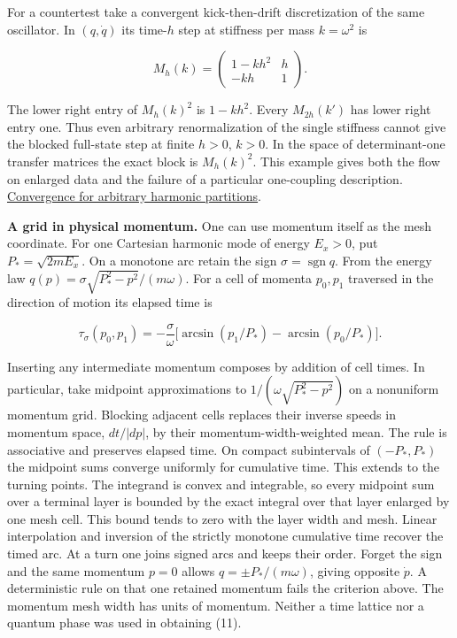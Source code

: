 \documentclass[11pt,a4paper]{article}
\begin{document}
For a countertest take a convergent kick-then-drift discretization of
the same oscillator. In \((q,\dot q)\) its time-\(h\) step at stiffness
per mass \(k=\omega^2\) is

\[
 M_h(k)=\begin{pmatrix}1-kh^2&h\\-kh&1\end{pmatrix}.
\]

The lower right entry of \(M_h(k)^2\) is \(1-kh^2\). Every
\(M_{2h}(k')\) has lower right entry one. Thus even arbitrary
renormalization of the single stiffness cannot give the blocked
full-state step at finite \(h>0\), \(k>0\). In the space of
determinant-one transfer matrices the exact block is \(M_h(k)^2\). This
example gives both the flow on enlarged data and the failure of a
particular one-coupling description.
\href{https://arivero.github.io/navstokgap/notes/refinement-composition-and-limit.html\#c.-all-refinement-sequences-and-two-microscopic-kick-orders}{Convergence
for arbitrary harmonic partitions}.

\textbf{A grid in physical momentum.} One can use momentum itself as the
mesh coordinate. For one Cartesian harmonic mode of energy \(E_x>0\),
put \(P_*=\sqrt{2mE_x}\). On a monotone arc retain the sign
\(\sigma=\operatorname{sgn}q\). From the energy law
\(q(p)=\sigma\sqrt{P_*^2-p^2}/(m\omega)\). For a cell of momenta
\(p_0,p_1\) traversed in the direction of motion its elapsed time is

\[
 \tau_\sigma(p_0,p_1)=-\frac{\sigma}{\omega}
      \big[\arcsin(p_1/P_*)-\arcsin(p_0/P_*)\big].                  \tag{11}
\]

Inserting any intermediate momentum composes by addition of cell times.
In particular, take midpoint approximations to
\(1/(\omega\sqrt{P_*^2-p^2})\) on a nonuniform momentum grid. Blocking
adjacent cells replaces their inverse speeds in momentum space,
\(dt/|dp|\), by their momentum-width-weighted mean. The rule is
associative and preserves elapsed time. On compact subintervals of
\((-P_*,P_*)\) the midpoint sums converge uniformly for cumulative time.
This extends to the turning points. The integrand is convex and
integrable, so every midpoint sum over a terminal layer is bounded by
the exact integral over that layer enlarged by one mesh cell. This bound
tends to zero with the layer width and mesh. Linear interpolation and
inversion of the strictly monotone cumulative time recover the timed
arc. At a turn one joins signed arcs and keeps their order. Forget the
sign and the same momentum \(p=0\) allows \(q=\pm P_* /(m\omega)\),
giving opposite \(\dot p\). A deterministic rule on that one retained
momentum fails the criterion above. The momentum mesh width has units of
momentum. Neither a time lattice nor a quantum phase was used in
obtaining (11).
\end{document}
